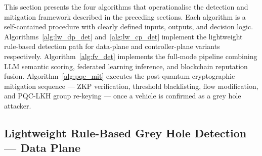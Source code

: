 \documentclass[12pt, a4paper]{report}
\begin{document}
This section presents the four algorithms that operationalise the detection and
mitigation framework described in the preceding sections. Each algorithm is a
self-contained procedure with clearly defined inputs, outputs, and decision
logic. Algorithms~\ref{alg:lw_dp_det} and~\ref{alg:lw_cp_det} implement the
lightweight rule-based detection path for data-plane and controller-plane
variants respectively. Algorithm~\ref{alg:fv_det} implements the full-mode
pipeline combining LLM semantic scoring, federated learning inference, and
blockchain reputation fusion. Algorithm~\ref{alg:pqc_mit} executes the
post-quantum cryptographic mitigation sequence — ZKP verification, threshold
blacklisting, flow modification, and PQC-LKH group re-keying — once a vehicle
is confirmed as a grey hole attacker.

\subsection{Lightweight Rule-Based Grey Hole Detection — Data Plane}
\end{document}
